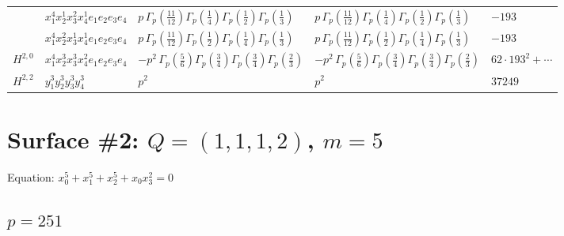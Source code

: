 \documentclass[11pt]{article}
\begin{document}
\begin{table}[ht]
{\begin{tabular}{@{}lllll@{}}
 & $x_{1}^{4} x_{2}^{1} x_{3}^{2} x_{4}^{1}  e_{1} e_{2} e_{3} e_{4}$ & $p \, \Gamma_p \left( \frac{11}{12} \right) \Gamma_p \left( \frac{1}{4} \right) \Gamma_p \left( \frac{1}{2} \right) \Gamma_p \left( \frac{1}{3} \right)$ & $p \, \Gamma_p \left( \frac{11}{12} \right) \Gamma_p \left( \frac{1}{4} \right) \Gamma_p \left( \frac{1}{2} \right) \Gamma_p \left( \frac{1}{3} \right)$ & $-193$ \\
 & $x_{1}^{4} x_{2}^{2} x_{3}^{1} x_{4}^{1}  e_{1} e_{2} e_{3} e_{4}$ & $p \, \Gamma_p \left( \frac{11}{12} \right) \Gamma_p \left( \frac{1}{2} \right) \Gamma_p \left( \frac{1}{4} \right) \Gamma_p \left( \frac{1}{3} \right)$ & $p \, \Gamma_p \left( \frac{11}{12} \right) \Gamma_p \left( \frac{1}{2} \right) \Gamma_p \left( \frac{1}{4} \right) \Gamma_p \left( \frac{1}{3} \right)$ & $-193$ \\
\midrule
$H^{2,0}$ & $x_{1}^{4} x_{2}^{3} x_{3}^{3} x_{4}^{2}  e_{1} e_{2} e_{3} e_{4}$ & $- p^{2} \, \Gamma_p \left( \frac{5}{6} \right) \Gamma_p \left( \frac{3}{4} \right) \Gamma_p \left( \frac{3}{4} \right) \Gamma_p \left( \frac{2}{3} \right)$ & $- p^{2} \, \Gamma_p \left( \frac{5}{6} \right) \Gamma_p \left( \frac{3}{4} \right) \Gamma_p \left( \frac{3}{4} \right) \Gamma_p \left( \frac{2}{3} \right)$ & $62{\cdot}193^{2}{+}\cdots$ \\
\midrule
$H^{2,2}$ & $y_{1}^{3} y_{2}^{3} y_{3}^{3} y_{4}^{3}$ & $p^{2} \,$ & $p^{2} \,$ & $37249$ \\
\bottomrule
\end{tabular}
}
\renewcommand{\arraystretch}{1.0}
\end{table}

\newpage

\section*{Surface \#2: $Q=(1, 1, 1, 2)$, $m=5$}

Equation: $x_0^{5} + x_1^{5} + x_2^{5} + x_0 x_3^{2} = 0$

\subsection*{$p = 251$}
\end{document}
